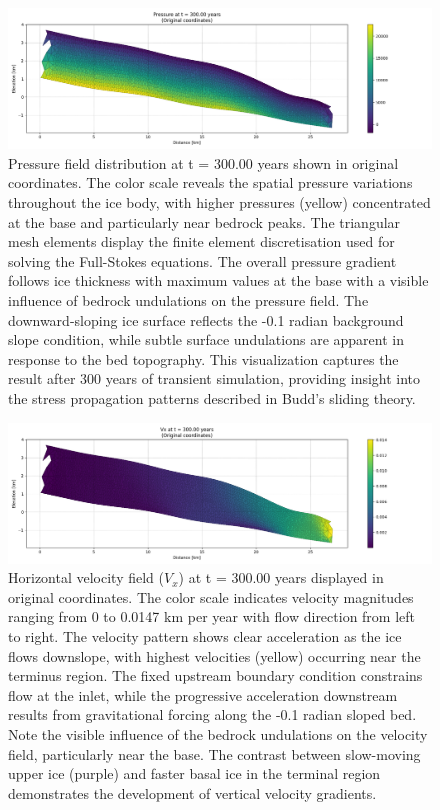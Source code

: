\begin{figure}
    \includegraphics[scale=0.45]{Pressure_300yrs_xz.png}
    \caption{Pressure field distribution at t = 300.00 years shown in original coordinates. The color scale reveals the spatial pressure variations throughout the ice body, with higher pressures (yellow) concentrated at the base and particularly near bedrock peaks. The triangular mesh elements display the finite element discretisation used for solving the Full-Stokes equations. The overall pressure gradient follows ice thickness with maximum values at the base with a visible influence of bedrock undulations on the pressure field. The downward-sloping ice surface reflects the -0.1 radian background slope condition, while subtle surface undulations are apparent in response to the bed topography. This visualization captures the result after 300 years of transient simulation, providing insight into the stress propagation patterns described in Budd's sliding theory.}
    \label{fig:Pressure}
\end{figure}

\begin{figure}
    \includegraphics[scale=0.45]{Vx_300yrs_xz.png}
    \caption{
    Horizontal velocity field ($V_x$) at t = 300.00 years displayed in original coordinates. The color scale indicates velocity magnitudes ranging from 0 to 0.0147 km per year with flow direction from left to right. The velocity pattern shows clear acceleration as the ice flows downslope, with highest velocities (yellow) occurring near the terminus region. The fixed upstream boundary condition constrains flow at the inlet, while the progressive acceleration downstream results from gravitational forcing along the -0.1 radian sloped bed. Note the visible influence of the bedrock undulations on the velocity field, particularly near the base. The contrast between slow-moving upper ice (purple) and faster basal ice in the terminal region demonstrates the development of vertical velocity gradients.}
    \label{fig:Vx}
\end{figure}


